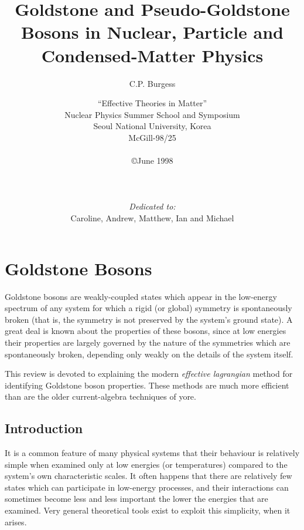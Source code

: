 \documentclass[12pt,epsf]{report}
\begin{document}
%
%
\title{Goldstone and Pseudo-Goldstone Bosons in Nuclear,
Particle and Condensed-Matter Physics }
\author{C.P. Burgess}
\date{``Effective Theories in Matter''\\
Nuclear Physics Summer School and Symposium\\
Seoul National University, Korea \\
McGill-98/25\\
$ $ \\
\copyright June 1998\\ 
$ $  \\
$ $  \\
$ $  \\
{\sl Dedicated to:} \\
Caroline, Andrew, Matthew, Ian and Michael}
\maketitle
{}
\tableofcontents
\listoffigures
\listoftables





\chapter{Goldstone Bosons}

Goldstone bosons are  weakly-coupled states which appear in
the low-energy spectrum of any system for which a rigid (or
global) symmetry is spontaneously broken (that is, the
symmetry is not preserved by the system's ground state).  A
great deal is known about the properties of these bosons,
since at low energies their properties are largely governed
by the nature of the symmetries which are spontaneously
broken, depending only weakly on the details of the system
itself.

This review is devoted to explaining the modern {\it
effective lagrangian} method for identifying Goldstone
boson properties. These methods are much more efficient
than are the older current-algebra techniques of yore. 

\section{Introduction}

It is a common feature of many physical systems that their
behaviour is relatively simple when examined only at low
energies (or temperatures) compared to the system's own
characteristic scales. It often happens that there are
relatively few states which can participate in low-energy
processes, and their interactions can sometimes become less
and less important the lower the energies that are examined.
Very general theoretical tools exist to exploit this
simplicity, when it arises.
\end{document}
